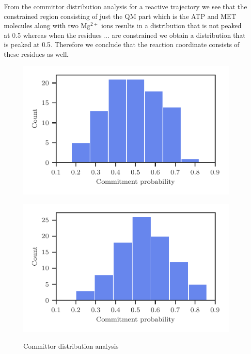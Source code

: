 \documentclass[journal=jpcbfk,manuscript=article,layout=twocolumn]{achemso}
\begin{document}
From the committor distribution analysis for a reactive trajectory we see that the 
constrained region consisting of just the QM part which is the ATP and MET molecules 
along with two Mg$^{2+}$ ions results in a distribution that is not peaked 
at 0.5 whereas when the residues ... are constrained we obtain a distribution 
that is peaked at 0.5. Therefore we conclude that the reaction coordinate consists
of these residues as well. 
\begin{figure}[ht!]
\centering
\begin{minipage}[b]{0.45\linewidth}
\includegraphics[width=\textwidth]{figures/comm-60-mat2a-nocons.pdf}
\label{fig:minipage1}
\end{minipage}
\quad
\begin{minipage}[b]{0.45\linewidth}
\includegraphics[width=\textwidth]{figures/comm-60-mat2a.pdf}
\label{fig:minipage2}
\end{minipage}
\caption{Committor distribution analysis}
\end{figure}
\end{document}
